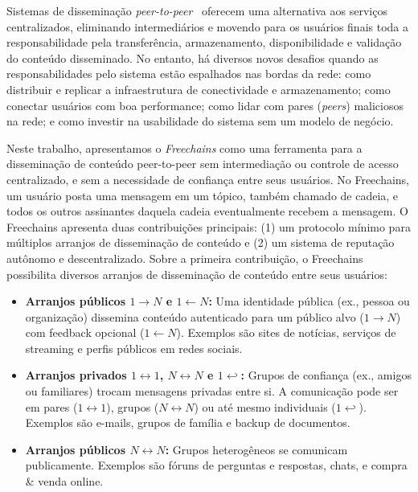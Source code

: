 \documentclass[12pt]{article}
\newcommand{\FC} {Freechains\xspace}
\newcommand{\Xon} {$1{\rightarrow}N$\xspace}
\newcommand{\Xno} {$1{\leftarrow}N$\xspace}
\newcommand{\Xnn} {$N{\leftrightarrow}N$\xspace}
\newcommand{\Xoo} {$1{\leftrightarrow}1$\xspace}
\newcommand{\Xo}  {$1{\hookleftarrow}$\xspace}
\begin{document}
Sistemas de disseminação \emph{peer-to-peer}~\cite{p2p.survey} oferecem uma
alternativa aos serviços centralizados, eliminando intermediários e movendo
para os usuários finais toda a responsabilidade pela transferência,
armazenamento, disponibilidade e validação do conteúdo disseminado.
No entanto, há diversos novos desafios quando as responsabilidades pelo sistema
estão espalhados nas bordas da rede:
    como distribuir e replicar a infraestrutura de conectividade e
    armazenamento;
    como conectar usuários com boa performance;
    como lidar com pares (\emph{peers}) maliciosos na rede;
    e como investir na usabilidade do sistema sem um modelo de negócio.

Neste trabalho, apresentamos o \emph{\FC} como uma ferramenta para a
disseminação de conteúdo peer-to-peer sem intermediação ou controle de acesso
centralizado, e sem a necessidade de confiança entre seus usuários.
No \FC, um usuário posta uma mensagem em um tópico, também chamado de
cadeia, e todos os outros assinantes daquela cadeia eventualmente recebem a
mensagem.
O \FC apresenta duas contribuições principais: (1) um protocolo mínimo para
múltiplos arranjos de disseminação de conteúdo e (2) um sistema de reputação
autônomo e descentralizado.
%
Sobre a primeira contribuição, o \FC possibilita diversos arranjos de
disseminação de conteúdo entre seus usuários:
%
\begin{itemize}
\item \textbf{Arranjos públicos \Xon e \Xno:}
    Uma identidade pública (ex., pessoa ou organização) dissemina conteúdo
    autenticado para um público alvo (\Xon) com feedback opcional (\Xno).
    Exemplos são sites de notícias, serviços de streaming e perfis públicos em
    redes sociais.
\item \textbf{Arranjos privados \Xoo, \Xnn e \Xo:}
    Grupos de confiança (ex., amigos ou familiares) trocam mensagens privadas
    entre si.
    A comunicação pode ser em pares (\Xoo), grupos (\Xnn) ou até mesmo
    individuais (\Xo).
    Exemplos são e-mails, grupos de família e backup de documentos.
\item \textbf{Arranjos públicos \Xnn:}
    Grupos heterogêneos se comunicam publicamente. Exemplos são fóruns de
    perguntas e respostas, chats, e compra \& venda online.
\end{itemize}
%
\end{document}
